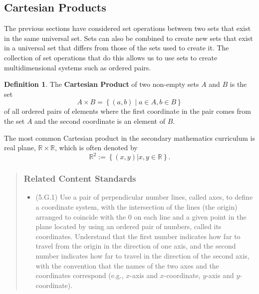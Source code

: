\documentclass[
]{book}
\providecommand{\tightlist}{%
  \setlength{\itemsep}{0pt}\setlength{\parskip}{0pt}}
\theoremstyle{definition}
\newtheorem{definition}{Definition}[chapter]
\theoremstyle{definition}
\theoremstyle{definition}
\theoremstyle{remark}
\begin{document}
\hypertarget{subsec:cartesian}{%
\subsection{Cartesian Products}\label{subsec:cartesian}}

The previous sections have considered set operations between two sets that exist in the same universal set. Sets can also be combined to create new sets that exist in a universal set that differs from those of the sets used to create it. The collection of set operations that do this allows us to use sets to create multidimensional systems such as ordered pairs.

\begin{definition}
\protect\hypertarget{def:unnamed-chunk-28}{}{\label{def:unnamed-chunk-28} } The \textbf{Cartesian Product} of two non-empty sets \(A\) and \(B\) is the set
\[A\times B = \left\{ (a,b) \middle \vert a \in A, b\in B\right\}\] of all ordered pairs of elements where the first coordinate in the pair comes from the set \(A\) and the second coordinate is an element of \(B\).
\end{definition}

The most common Cartesian product in the secondary mathematics curriculum is real plane, \(\mathbb{R} \times \mathbb{R}\), which is often denoted by \[\mathbb{R}^2:= \left\{ (x,y) \vert x,y\in \mathbb{R} \right\}.\]

\begin{quote}
\hypertarget{related-content-standards-2}{%
\subsubsection*{Related Content Standards}\label{related-content-standards-2}}

\begin{itemize}
\tightlist
\item
  (5.G.1) Use a pair of perpendicular number lines, called axes, to define a coordinate system, with the intersection of the lines (the origin) arranged to coincide with the \(0\) on each line and a given point in the plane located by using an ordered pair of numbers, called its coordinates. Understand that the first number indicates how far to travel from the origin in the direction of one axis, and the second number indicates how far to travel in the direction of the second axis, with the convention that the names of the two axes and the coordinates correspond (e.g., \(x\)-axis and \(x\)-coordinate, \(y\)-axis and \(y\)-coordinate).
\end{itemize}
\end{quote}
\end{document}
